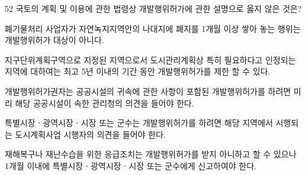 \begin{question}{52}
국토의 계획 및 이용에 관한 법령상 개발행위허가에 관한 설명으로 옳지 않은 것은?
\begin{choices}
  \item 폐기물처리 사업자가 자연녹지지역안의 나대지에 폐지를 1개월 이상 쌓아 놓는 행위는 개발행위허가 대상이 아니다.
  \item 지구단위계획구역으로 지정된 지역으로서 도시관리계획상 특히 필요하다고 인정되는 지역에 대하여는 최고 5년 이내의 기간 동안 개발행위허가를 제한 할 수 있다.
  \item 개발행위허가권자는 공공시설의 귀속에 관한 사항이 포함된 개발행위허가를 하려면 미리 해당 공공시설이 속한 관리청의 의견을 들어야 한다.
  \item 특별시장ㆍ광역시장ㆍ시장 또는 군수는 개발행위허가를 하려면 해당 지역에서 시행되는 도시계획사업 시행자의 의견을 들어야 한다.
  \item 재해복구나 재난수습을 위한 응급조치는 개발행위허가를 받지 아니하고 할 수 있으나 1개월 이내에 특별시장ㆍ광역시장ㆍ시장 또는 군수에게 신고하여야 한다.
\end{choices}
\end{question}
